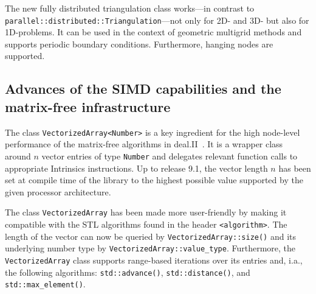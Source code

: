 \documentclass{ansarticle-preprint}
\begin{document}
The new fully distributed triangulation class works---in contrast to  
\texttt{parallel::distributed::\allowbreak Tri\-an\-gu\-la\-tion}---not only for 2D- and 3D- but also for 
1D-problems. It can be used in the context of geometric multigrid methods and 
supports periodic boundary conditions. Furthermore, hanging nodes are supported.



\subsection{Advances of the SIMD capabilities and the matrix-free infrastructure}
\label{subsec:mf}


The class \texttt{VectorizedArray<Number>} is a key ingredient for the high 
node-level performance of the matrix-free algorithms in deal.II~\cite{KronbichlerKormann2012, KronbichlerKormann2019}. It is a wrapper 
class around $n$ vector entries of type \texttt{Number} and delegates relevant 
function calls to appropriate Intrinsics instructions. Up to release 9.1, the 
vector length $n$ has been set at compile time of the library to the highest 
possible value supported by the given processor architecture.

The class \texttt{VectorizedArray} has been made more user-friendly by making 
it compatible with the STL algorithms found in the header \texttt{<algorithm>}. 
The length of the  vector can now be queried by  \texttt{VectorizedArray::size()} and its underlying number type by \texttt{VectorizedArray::value\_type}. 
Furthermore, the \texttt{VectorizedArray} class supports range-based iterations over its entries and, i.a., the following 
algorithms: \texttt{std::\allowbreak ad\-vance()}, \texttt{std::distance()}, and \texttt{std::max\_element()}.
\end{document}
